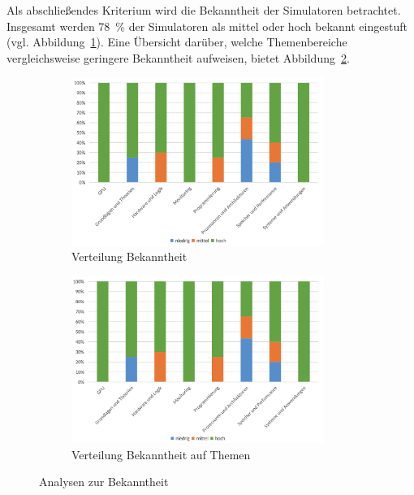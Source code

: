 Als abschließendes Kriterium wird die Bekanntheit der Simulatoren betrachtet. Insgesamt werden 78~\% der Simulatoren als mittel oder hoch bekannt eingestuft (vgl. Abbildung~\ref{fig:15-bekanntheit}). Eine Übersicht darüber, welche Themenbereiche vergleichsweise geringere Bekanntheit aufweisen, bietet Abbildung~\ref{fig:16-bekanntheit-thema}.

\begin{figure}[!htbp]
    \centering
    \begin{subfigure}[b]{0.48\textwidth}
        \centering
        \includegraphics[width=0.90\textwidth]{graphics_sim/15-bekanntheit.png}
        \caption{Verteilung Bekanntheit}
        \label{fig:15-bekanntheit}
    \end{subfigure}
    \hfill
    \begin{subfigure}[b]{0.48\textwidth}
        \centering
        \includegraphics[width=0.90\textwidth]{graphics_sim/16-bekanntheit-thema.png}
        \caption{Verteilung Bekanntheit auf Themen}
        \label{fig:16-bekanntheit-thema}
    \end{subfigure}
    \caption{Analysen zur Bekanntheit}
    \label{fig:bekanntheit-gesamt}
\end{figure}

